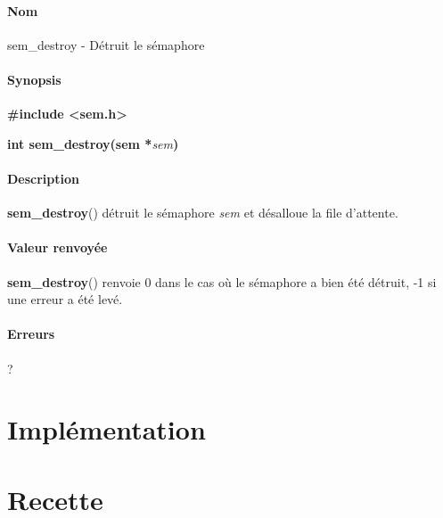 \documentclass[12pt]{article}
\begin{document}
        \paragraph{Nom\\}
        sem\_destroy - Détruit le sémaphore
        \paragraph{Synopsis\\}
        \textbf{\#include <sem.h>}

        \textbf{int sem\_destroy(sem *}\textit{sem}\textbf{)}
        \paragraph{Description\\}
        \textbf{sem\_destroy}() détruit le sémaphore \textit{sem} et désalloue la file d'attente.

        \paragraph{Valeur renvoyée\\}
        \textbf{sem\_destroy}() renvoie 0 dans le cas où le sémaphore a bien été détruit, -1 si une erreur a été levé.
        \paragraph{Erreurs\\}
        ?
    \newpage

\section{Implémentation}
\newpage
\section{Recette}
		
\end{document}
